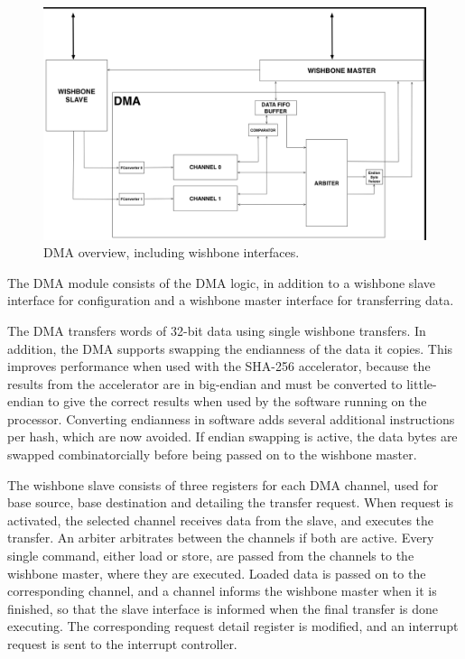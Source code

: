 \begin{figure}[htb]
    \centering
    \includegraphics[width=1.0\textwidth]{Figures/DMA/DMATopview}
    \caption{DMA overview, including wishbone interfaces.}
    \label{fig:DMATop}
\end{figure}

The DMA module consists of the DMA logic, in addition to a wishbone slave interface for configuration
and a wishbone master interface for transferring data.

The DMA transfers words of 32-bit data using single wishbone transfers.  In addition, the DMA supports
swapping the endianness of the data it copies. This improves performance when used with the SHA-256
accelerator, because the results from the accelerator are in big-endian
and must be converted to little-endian to give the correct results when used by the software running on the processor.
Converting endianness in software adds several additional instructions per hash, which are now avoided.
If endian swapping is active, the data bytes are swapped combinatorcially before being passed on to the wishbone master.

The wishbone slave consists of three registers for each DMA channel, used for base source, base destination and detailing the transfer request.
When request is activated, the selected channel receives data from the slave, and executes the transfer.
An arbiter arbitrates between the channels if both are active.
Every single command, either load or store, are passed from the channels to the wishbone master, where they are executed.
Loaded data is passed on to the corresponding channel, and a channel informs the wishbone master when it is finished, so that the slave interface is informed when the final transfer is done executing.
The corresponding request detail register is modified, and an interrupt request is sent to the interrupt controller.

